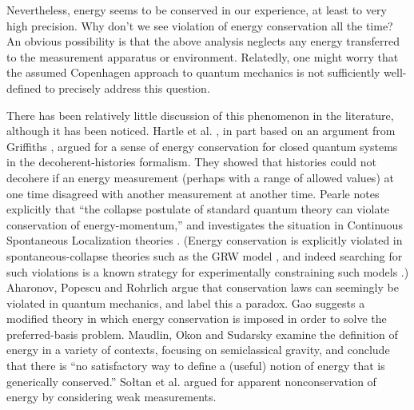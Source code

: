\documentclass[aps,prd,onecolumn,nofootinbib,notitlepage]{revtex4-1}
\begin{document}
Nevertheless, energy seems to be conserved in our experience, at least to very high precision. 
Why don't we see violation of energy conservation all the time? 
An obvious possibility is that the above analysis neglects any energy transferred to the measurement apparatus or environment. 
Relatedly, one might worry that the assumed Copenhagen approach to quantum mechanics is not sufficiently well-defined to precisely address this question.

There has been relatively little discussion of this phenomenon in the literature, although it has been noticed.
Hartle et al. \cite{hartle1995conservation}, in part based on an argument from Griffiths \cite{griffiths}, argued for a sense of energy conservation for closed quantum systems in the decoherent-histories formalism.
They showed that histories could not decohere if an energy measurement (perhaps with a range of allowed values) at one time disagreed with another measurement at another time.
Pearle \cite{Pearle:2000qb} notes explicitly that ``the collapse postulate of standard quantum theory can violate conservation of energy-momentum,'' and investigates the situation in Continuous Spontaneous Localization theories \cite{Pearle:1988uh,Ghirardi:1989cn}.
(Energy conservation is explicitly violated in spontaneous-collapse theories such as the GRW model \cite{Ghirardi:1985mt}, and indeed searching for such violations is a known strategy for experimentally constraining such models \cite{vinante2016upper}.)
Aharonov, Popescu and Rohrlich  \cite{2016arXiv160905041A} argue that conservation laws can seemingly be violated in quantum mechanics, and label this a paradox.
Gao \cite{Gao:2016cmq} suggests a modified theory in which energy conservation is imposed in order to solve the preferred-basis problem.
Maudlin, Okon and Sudarsky \cite{Maudlin:2019bje} examine the definition of energy in a variety of contexts, focusing on semiclassical gravity, and conclude that there is ``no satisfactory way to define a (useful) notion of energy that is generically conserved.''
So{\l}tan et al. \cite{2019arXiv190706354S} argued for apparent nonconservation of energy by considering weak measurements.
\end{document}
